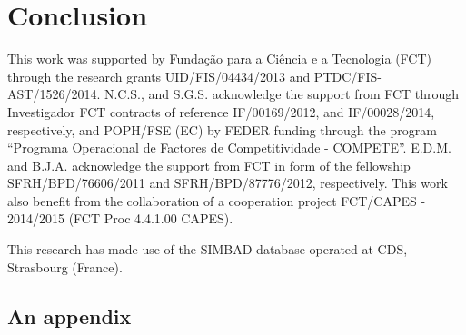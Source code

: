 \documentclass{aa}
\begin{document}
\section{Conclusion}
\label{sec:conclusion}




\begin{acknowledgements}

This work was supported by Funda\c{c}\~ao para a Ci\^encia e a
Tecnologia (FCT) through the research grants UID/FIS/04434/2013 and
PTDC/FIS-AST/1526/2014. N.C.S., and S.G.S. acknowledge the support from
FCT through Investigador FCT contracts of reference IF/00169/2012, and
IF/00028/2014, respectively, and POPH/FSE (EC) by FEDER funding through
the program “Programa Operacional de Factores de Competitividade
- COMPETE”. E.D.M. and B.J.A. acknowledge the support from FCT in
form of the fellowship SFRH/BPD/76606/2011 and SFRH/BPD/87776/2012,
respectively. This work also benefit from the collaboration of a
cooperation project FCT/CAPES - 2014/2015 (FCT Proc 4.4.1.00 CAPES).

This research has made use of the SIMBAD database operated at CDS,
Strasbourg (France).

\end{acknowledgements}






\begin{appendix}
\section{An appendix}


\end{appendix}
\end{document}
